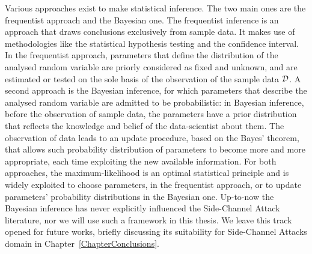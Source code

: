 Various approaches exist to make statistical inference. The two main ones are the frequentist approach and the Bayesian one. The frequentist inference is an approach that draws conclusions exclusively from sample data. It makes use of methodologies like the statistical hypothesis testing and the confidence interval. In the frequentist approach, parameters that define the distribution of the analysed random variable are priorly considered as fixed and unknown, and are estimated or tested on the sole basis of the observation of the sample data $\mathcal{D}$. A second approach is the Bayesian inference, for which parameters that describe the analysed random variable are admitted to be probabilistic: in Bayesian inference, before the observation of sample data, the parameters have a prior distribution that reflects the knowledge and belief of the data-scientist about them. The observation of data leads to an update procedure, based on the Bayes' theorem, that allows such probability distribution of parameters to become more and more appropriate, each time exploiting the new available information. For both approaches, the maximum-likelihood is an optimal statistical principle and is widely exploited to choose parameters, in the frequentist approach, or to update parameters' probability distributions in the Bayesian one. Up-to-now the Bayesian inference has never explicitly influenced the Side-Channel Attack literature, nor we will use such a framework in this thesis. We leave this track opened for future works, briefly discussing its suitability for Side-Channel Attacks domain in Chapter~\ref{ChapterConclusions}.


